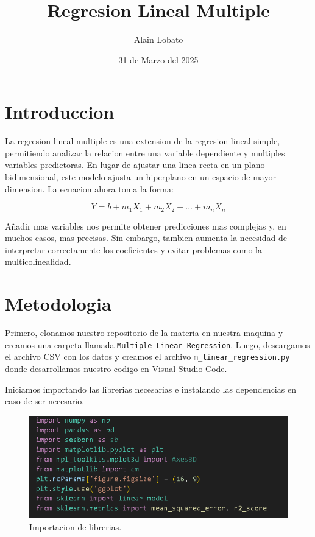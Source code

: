 \documentclass{article}
\title{Regresion Lineal Multiple}
\author{Alain Lobato}
\date{31 de Marzo del 2025}
\begin{document}
\maketitle

\section{Introduccion}
La regresion lineal multiple es una extension de la regresion lineal simple, permitiendo analizar la relacion entre una variable dependiente y multiples variables predictoras. En lugar de ajustar una linea recta en un plano bidimensional, este modelo ajusta un hiperplano en un espacio de mayor dimension. La ecuacion ahora toma la forma:

\begin{equation}
Y = b + m_1X_1 + m_2X_2 + \dots + m_nX_n
\end{equation}

A\~nadir mas variables nos permite obtener predicciones mas complejas y, en muchos casos, mas precisas. Sin embargo, tambien aumenta la necesidad de interpretar correctamente los coeficientes y evitar problemas como la multicolinealidad.

\section{Metodologia}
Primero, clonamos nuestro repositorio de la materia en nuestra maquina y creamos una carpeta llamada \texttt{Multiple Linear Regression}. Luego, descargamos el archivo CSV con los datos y creamos el archivo \texttt{m\_linear\_regression.py} donde desarrollamos nuestro codigo en Visual Studio Code.

Iniciamos importando las librerias necesarias e instalando las dependencias en caso de ser necesario.

\begin{figure}[H]
    \centering
    \includegraphics[width=0.8\linewidth]{img/1.png}
    \caption{Importacion de librerias.}
\end{figure}
\end{document}
